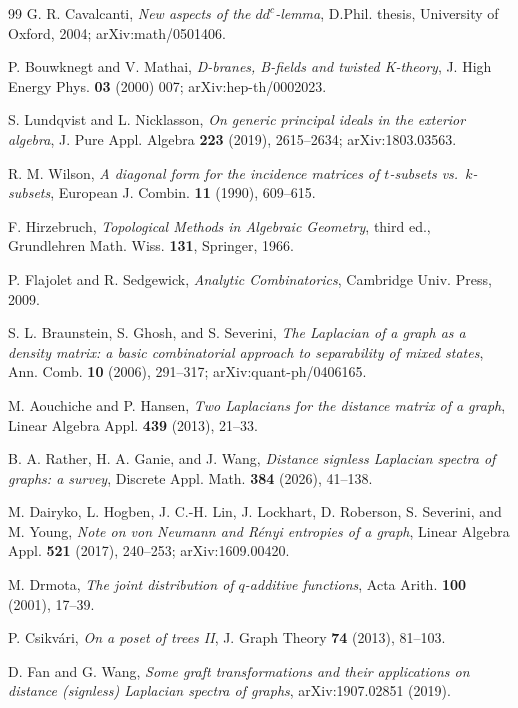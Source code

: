 \documentclass[11pt]{article}
\theoremstyle{definition}
\begin{document}
\begin{thebibliography}{99}
 G. R. Cavalcanti, \emph{New aspects of the $dd^c$-lemma}, D.Phil. thesis, University of Oxford, 2004; arXiv:math/0501406.

 P. Bouwknegt and V. Mathai, \emph{D-branes, B-fields and twisted K-theory}, J. High Energy Phys. \textbf{03} (2000) 007; arXiv:hep-th/0002023.

 S. Lundqvist and L. Nicklasson, \emph{On generic principal ideals in the exterior algebra}, J. Pure Appl. Algebra \textbf{223} (2019), 2615--2634; arXiv:1803.03563.

 R. M. Wilson, \emph{A diagonal form for the incidence matrices of $t$-subsets vs.\ $k$-subsets}, European J. Combin. \textbf{11} (1990), 609--615.

 F. Hirzebruch, \emph{Topological Methods in Algebraic Geometry}, third ed., Grundlehren Math. Wiss. \textbf{131}, Springer, 1966.

 P. Flajolet and R. Sedgewick, \emph{Analytic Combinatorics}, Cambridge Univ. Press, 2009.

 S. L. Braunstein, S. Ghosh, and S. Severini, \emph{The Laplacian of a graph as a density matrix: a basic combinatorial approach to separability of mixed states}, Ann. Comb. \textbf{10} (2006), 291--317; arXiv:quant-ph/0406165.

 M. Aouchiche and P. Hansen, \emph{Two Laplacians for the distance matrix of a graph}, Linear Algebra Appl. \textbf{439} (2013), 21--33.

 B. A. Rather, H. A. Ganie, and J. Wang, \emph{Distance signless Laplacian spectra of graphs: a survey}, Discrete Appl. Math. \textbf{384} (2026), 41--138.

 M. Dairyko, L. Hogben, J. C.-H. Lin, J. Lockhart, D. Roberson, S. Severini, and M. Young, \emph{Note on von Neumann and R\'enyi entropies of a graph}, Linear Algebra Appl. \textbf{521} (2017), 240--253; arXiv:1609.00420.

 M. Drmota, \emph{The joint distribution of $q$-additive functions}, Acta Arith. \textbf{100} (2001), 17--39.

 P. Csikv\'ari, \emph{On a poset of trees II}, J. Graph Theory \textbf{74} (2013), 81--103.

 D. Fan and G. Wang, \emph{Some graft transformations and their applications on distance (signless) Laplacian spectra of graphs}, arXiv:1907.02851 (2019).


\end{thebibliography}
\end{document}
